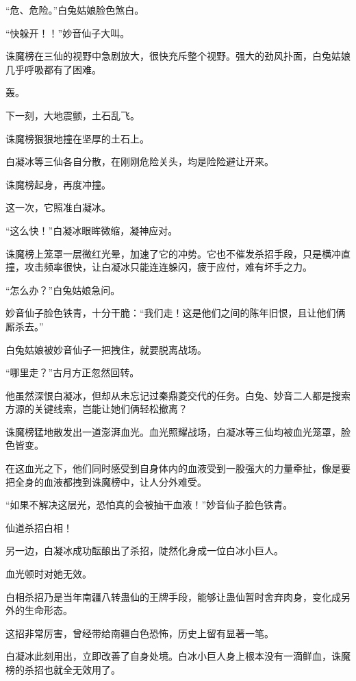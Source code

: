
\begin{this_body}

“危、危险。”白兔姑娘脸色煞白。

“快躲开！！”妙音仙子大叫。

诛魔榜在三仙的视野中急剧放大，很快充斥整个视野。强大的劲风扑面，白兔姑娘几乎呼吸都有了困难。

轰。

下一刻，大地震颤，土石乱飞。

诛魔榜狠狠地撞在坚厚的土石上。

白凝冰等三仙各自分散，在刚刚危险关头，均是险险避让开来。

诛魔榜起身，再度冲撞。

这一次，它照准白凝冰。

“这么快！”白凝冰眼眸微缩，凝神应对。

诛魔榜上笼罩一层微红光晕，加速了它的冲势。它也不催发杀招手段，只是横冲直撞，攻击频率很快，让白凝冰只能连连躲闪，疲于应付，难有坏手之力。

“怎么办？”白兔姑娘急问。

妙音仙子脸色铁青，十分干脆：“我们走！这是他们之间的陈年旧恨，且让他们俩厮杀去。”

白兔姑娘被妙音仙子一把拽住，就要脱离战场。

“哪里走？”古月方正忽然回转。

他虽然深恨白凝冰，但却从未忘记过秦鼎菱交代的任务。白兔、妙音二人都是搜索方源的关键线索，岂能让她们俩轻松撤离？

诛魔榜猛地散发出一道澎湃血光。血光照耀战场，白凝冰等三仙均被血光笼罩，脸色皆变。

在这血光之下，他们同时感受到自身体内的血液受到一股强大的力量牵扯，像是要把全身的血液都拽到诛魔榜中，让人分外难受。

“如果不解决这层光，恐怕真的会被抽干血液！”妙音仙子脸色铁青。

仙道杀招白相！

另一边，白凝冰成功酝酿出了杀招，陡然化身成一位白冰小巨人。

血光顿时对她无效。

白相杀招乃是当年南疆八转蛊仙的王牌手段，能够让蛊仙暂时舍弃肉身，变化成另外的生命形态。

这招非常厉害，曾经带给南疆白色恐怖，历史上留有显著一笔。

白凝冰此刻用出，立即改善了自身处境。白冰小巨人身上根本没有一滴鲜血，诛魔榜的杀招也就全无效用了。


\end{this_body}
